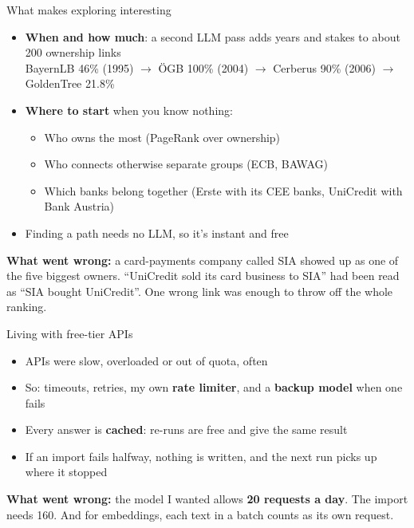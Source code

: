 \documentclass[aspectratio=169,11pt]{beamer}
\newcommand{\hl}[1]{\textcolor{midblue}{\textbf{#1}}}
\newcommand{\story}[1]{\par\vspace{6pt}\small\textcolor{softred}{\textbf{What went wrong:}} #1}
\begin{document}
\begin{frame}{What makes exploring interesting}
  \begin{itemize}
    \item \hl{When and how much}: a second LLM pass adds years and stakes to about 200 ownership links\\
      \small BayernLB 46\% (1995) $\rightarrow$ ÖGB 100\% (2004) $\rightarrow$ Cerberus 90\% (2006) $\rightarrow$ GoldenTree 21.8\%
    \item \hl{Where to start} when you know nothing:
      \begin{itemize}\small
        \item Who owns the most (PageRank over ownership)
        \item Who connects otherwise separate groups (ECB, BAWAG)
        \item Which banks belong together (Erste with its CEE banks, UniCredit with Bank Austria)
      \end{itemize}
    \item Finding a path needs no LLM, so it's instant and free
  \end{itemize}
  \story{a card-payments company called SIA showed up as one of the five biggest owners.
    ``UniCredit sold its card business to SIA'' had been read as ``SIA bought UniCredit''.
    One wrong link was enough to throw off the whole ranking.}
\end{frame}

\begin{frame}{Living with free-tier APIs}
  \begin{itemize}
    \item APIs were slow, overloaded or out of quota, often
    \item So: timeouts, retries, my own \hl{rate limiter}, and a \hl{backup model} when one fails
    \item Every answer is \hl{cached}: re-runs are free and give the same result
    \item If an import fails halfway, nothing is written, and the next run picks up where it stopped
  \end{itemize}
  \story{the model I wanted allows \hl{20 requests a day}. The import needs 160.
    And for embeddings, each text in a batch counts as its own request.}
\end{frame}
\end{document}

